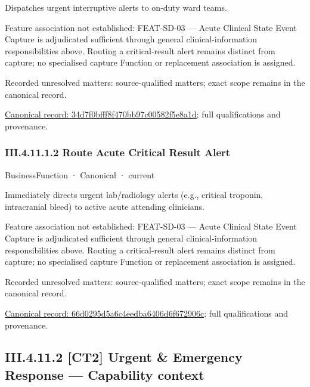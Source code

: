 Dispatches urgent interruptive alerts to on-duty ward teams.



Feature association not established: FEAT-SD-03 — Acute Clinical State Event Capture is adjudicated sufficient through general clinical-information responsibilities above. Routing a critical-result alert remains distinct from capture; no specialised capture Function or replacement association is assigned.


{\small Recorded unresolved matters: source-qualified matters; exact scope remains in the canonical record.}\par
{\footnotesize \href{../../../../../../../../continuum/business/business-service/34d7f0bfff8f470bb97c00582f5e8a1d.md}{Canonical record: 34d7f0bfff8f470bb97c00582f5e8a1d}; full qualifications and provenance.}\par
\subsubsection*{III.4.11.1.2 Route Acute Critical Result Alert}
\label{navigation:III.4.11.1.2}

\label{element:66d0295d5a6c4eedba6406d6f672906c}
{\small BusinessFunction · Canonical · current}\par

Immediately directs urgent lab/radiology alerts (e.g., critical troponin, intracranial bleed) to active acute attending clinicians.



Feature association not established: FEAT-SD-03 — Acute Clinical State Event Capture is adjudicated sufficient through general clinical-information responsibilities above. Routing a critical-result alert remains distinct from capture; no specialised capture Function or replacement association is assigned.


{\small Recorded unresolved matters: source-qualified matters; exact scope remains in the canonical record.}\par
{\footnotesize \href{../../../../../../../../continuum/business/business-function/66d0295d5a6c4eedba6406d6f672906c.md}{Canonical record: 66d0295d5a6c4eedba6406d6f672906c}; full qualifications and provenance.}\par
\subsection*{III.4.11.2 [CT2] Urgent \& Emergency Response — Capability context}
\label{navigation:III.4.11.2}

